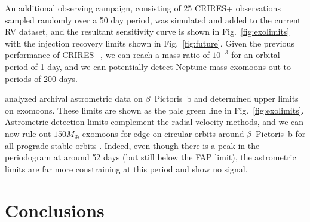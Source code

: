 \documentclass[fleqn,usenatbib]{mnras}
\newcommand{\bpb}{$\beta$~Pictoris~b}
\begin{document}
%                                     
%                                            

An additional observing campaign, consisting of 25 CRIRES+ observations sampled randomly over a 50 day period, was simulated and added to the current RV dataset, and the resultant sensitivity curve is shown in Fig.~\ref{fig:exolimits} with the injection recovery limits shown in Fig.~\ref{fig:future}.
%
Given the previous performance of CRIRES+, we can reach a mass ratio of $10^{-3}$ for an orbital period of 1 day, and we can potentially detect Neptune mass exomoons out to periods of 200 days.


\citet{Macias26} analyzed archival astrometric data on \bpb{} and determined upper limits on exomoons. 
%
These limits are shown as the pale green line in Fig.~\ref{fig:exolimits}.
%
Astrometric detection limits complement the radial velocity methods, and we can now rule out $150 M_\oplus$ exomoons for edge-on circular orbits around \bpb{} for all prograde stable orbits \citep[estimated as 0.44 of the Hill sphere radius using Eq. 5 from ][]{Domingos06}.
%
Indeed, even though there is a peak in the periodogram at around 52 days (but still below the FAP limit), the astrometric limits are far more constraining at this period and show no signal.  

\section{Conclusions}\label{sect:conclusions}
\end{document}
